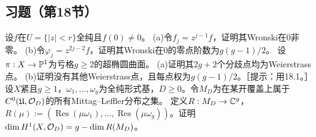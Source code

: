 \subsection*{习题（第18节）}
设$f$在$U=\{|z|<r\}$全纯且$f(0)\ne0$。
(a)令$f_j=z^{j-1}f$，证明其Wronski在0非零。
(b)令$\varphi_j=z^{2j-2}f$，证明其Wronski在0的零点阶数为$g(g-1)/2$。
设$\pi:X\to\mathbb P^1$为亏格$g\ge2$的超椭圆曲面。
(a)证明其$2g+2$个分歧点均为Weierstrass点。
(b)证明没有其他Weierstrass点，且每点权为$g(g-1)/2$。［提示：用18.1。］
设$X$紧且$g\ge1$，$\omega_1,\ldots,\omega_g$为全纯形式基，$D\ge0$。令$M_D$为在某开覆盖上属于$C^0(\mathfrak U,\mathcal O_D)$的所有Mittag--Leffler分布之集。
定义$R:M_D\to\mathbb C^g$，$R(\mu):=(\operatorname{Res}(\mu\omega_1),\ldots,\operatorname{Res}(\mu\omega_g))$。证明$\dim H^1(X,\mathcal O_D)=g-\dim R(M_D)$。
